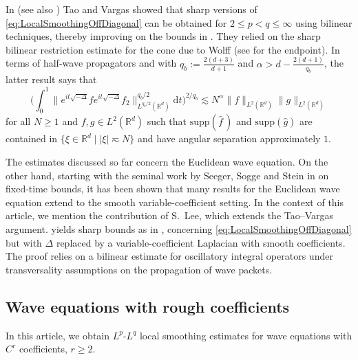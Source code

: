 \documentclass{amsart}
\numberwithin{equation}{section}
\theoremstyle{definition}
\newcommand{\R}{\mathbb{R}}
\newcommand{\Rd}{\mathbb{R}^{d}}
\newcommand {\ud}{\mathrm{d}}
\newcommand {\supp}{\mathrm{supp}}
\newcommand {\wh}{\widehat}
\begin{document}
In \cite{TaoVargas2000} (see also \cite{TaoVargasVega1998}) Tao and Vargas showed that sharp versions of \eqref{eq:LocalSmoothingOffDiagonal} can be obtained for $2\leq p<q\leq \infty$ using bilinear techniques, thereby improving on the bounds in \cite{SchlagSogge1997}.  
They relied on the sharp bilinear restriction estimate for the cone due to Wolff \cite{Wolff2001} (see  \cite{Tao01} for the endpoint). In terms of half-wave propagators and with $q_{b}:= \frac{2(d+3)}{d+1}$ and $\alpha>d-\frac{2(d+1)   }{q_{b}}$, the latter result says that
\begin{equation*}
\Big(\int_{0}^{1}\| e^{it \sqrt{- \Delta}} f e^{it \sqrt{-\Delta}}f_2 \|_{L^{q_{b}/2}(\R^d)}^{q_{b}/2}\ud t\Big)^{2/q_{b}} \lesssim%
N^{\alpha}%
\| f\|_{L^{2}(\Rd)} \| g\|_{L^{2}(\Rd)}
\end{equation*}
for all $N\geq1$ and $f,g\in L^{2}(\Rd)$ such that $\supp(\wh{f}\,)$ and $\supp(\wh{g})$ are contained in $\{\xi\in\Rd\mid |\xi|\eqsim N\}$ and have angular separation approximately $1$. 

The estimates discussed so far concern the Euclidean wave equation. On the other hand, starting with the seminal work by Seeger, Sogge and Stein in \cite{SeSoSt91} on fixed-time bounds, it has been shown that many results for the Euclidean wave equation extend to the smooth variable-coefficient setting. In the context of this article, we mention the contribution \cite{Lee2006} of S.~Lee, which extends the Tao--Vargas argument.\cite[Corollary 1.5]{Lee2006} yields sharp bounds as in \cite{TaoVargas2000}, concerning \eqref{eq:LocalSmoothingOffDiagonal} but with $\Delta$ replaced by a variable-coefficient Laplacian with smooth coefficients. The proof relies on a bilinear estimate for oscillatory integral operators under transversality assumptions on the propagation of wave packets.


\subsection{Wave equations with rough coefficients}

In this article, we obtain $L^p$-$L^q$ local smoothing estimates for wave equations with $C^{r}$ coefficients, $r\geq 2$. 
\end{document}
